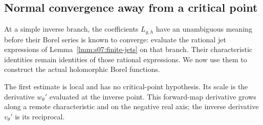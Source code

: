 \subsection{Normal convergence away from a critical point}
\label{subsec:b:regular}

At a simple inverse branch, the coefficients $L_{g,h}$ have an
unambiguous meaning before their Borel series is known to converge:
evaluate the rational jet expressions of
Lemma~\ref{lmm:s07:finite-jets} on that branch. Their characteristic
identities remain identities of those rational expressions. We now
use them to construct the actual holomorphic Borel functions.

The first estimate is local and has no critical-point hypothesis. Its
scale is the derivative $w_\theta'$ evaluated at the inverse point.
This forward-map derivative grows along a remote characteristic and on
the negative real axis; the inverse derivative $v_\theta'$ is its
reciprocal.

